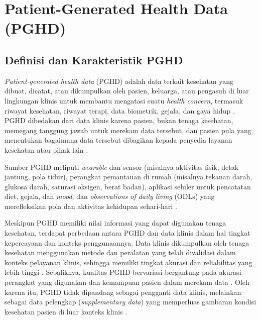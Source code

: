 \section{Patient-Generated Health Data (PGHD)}\label{studi-pghd}

\subsection{Definisi dan Karakteristik PGHD}

\textit{Patient-generated health data} (PGHD) adalah data terkait kesehatan yang dibuat, dicatat, atau dikumpulkan oleh pasien, keluarga, atau pengasuh di luar lingkungan klinis untuk membantu mengatasi suatu \textit{health concern}, termasuk riwayat kesehatan, riwayat terapi, data biometrik, gejala, dan gaya hidup \parencite{Mars_Scott_2022_PGHD_Healthcare,Abdolkhani_2019_PGHD_Quality_Challenges}.
PGHD dibedakan dari data klinis karena pasien, bukan tenaga kesehatan, memegang tanggung jawab untuk merekam data tersebut, dan pasien pula yang menentukan bagaimana data tersebut dibagikan kepada penyedia layanan kesehatan atau pihak lain \parencite{Mars_Scott_2022_PGHD_Healthcare,Abdolkhani_2019_PGHD_Quality_Challenges}.

Sumber PGHD meliputi \textit{wearable} dan sensor (misalnya aktivitas fisik, detak jantung, pola tidur), perangkat pemantauan di rumah (misalnya tekanan darah, glukosa darah, saturasi oksigen, berat badan), aplikasi seluler untuk pencatatan diet, gejala, dan \textit{mood}, dan \textit{observations of daily living} (ODLs) yang merefleksikan pola dan aktivitas kehidupan sehari-hari \parencite{Mars_Scott_2022_PGHD_Healthcare}.

Meskipun PGHD memiliki nilai informasi yang dapat digunakan tenaga kesehatan, terdapat perbedaan antara PGHD dan data klinis dalam hal tingkat kepercayaan dan konteks penggunaannya.
Data klinis dikumpulkan oleh tenaga kesehatan menggunakan metode dan peralatan yang telah divalidasi dalam konteks pelayanan klinis, sehingga memiliki tingkat akurasi dan reliabilitas yang lebih tinggi \parencite{Khatiwada_Yang_Lin_Blobel_2024_PGHD_Understanding}.
Sebaliknya, kualitas PGHD bervariasi bergantung pada akurasi perangkat yang digunakan dan kemampuan pasien dalam merekam data \parencite{Khatiwada_Yang_Lin_Blobel_2024_PGHD_Understanding}.
Oleh karena itu, PGHD tidak dipandang sebagai pengganti data klinis, melainkan sebagai data pelengkap (\textit{supplementary data}) yang memperluas gambaran kondisi kesehatan pasien di luar konteks klinis \parencite{ahima_fountain_2014_using_pghd_provenance}.

